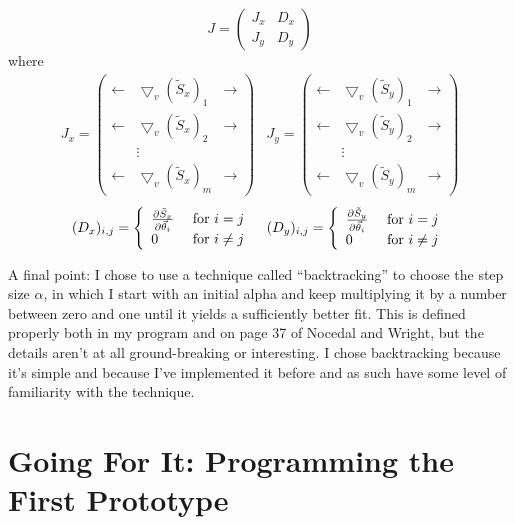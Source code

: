 \documentclass[12pt, letterpaper]{article}
\begin{document}
\[J=\begin{pmatrix}J_x & D_x \\ J_y & D_y\end{pmatrix}\]
where
\[\begin{matrix}J_x=\begin{pmatrix}
\leftarrow & \bigtriangledown_v(\tilde{S}_x)_1 & \rightarrow\\
\leftarrow & \bigtriangledown_v(\tilde{S}_x)_2 & \rightarrow\\
& \vdots &\\
\leftarrow & \bigtriangledown_v(\tilde{S}_x)_m & \rightarrow
\end{pmatrix}
&
J_y=\begin{pmatrix}
\leftarrow & \bigtriangledown_v(\tilde{S}_y)_1 & \rightarrow\\
\leftarrow & \bigtriangledown_v(\tilde{S}_y)_2 & \rightarrow\\
& \vdots &\\
\leftarrow & \bigtriangledown_v(\tilde{S}_y)_m & \rightarrow
\end{pmatrix}
\end{matrix}\]
\[\begin{matrix}
(D_x)_{i,j}=\left\{\begin{array}{l l}
\frac{\partial\tilde{S}_x}{\partial\vec{\theta}_i} & \text{ for } i=j\\
0 & \text{ for } i \ne j
\end{array}\right.
&
(D_y)_{i,j}=\left\{\begin{array}{l l}
\frac{\partial\tilde{S}_y}{\partial\vec{\theta}_i} & \text{ for } i=j\\
0 & \text{ for } i \ne j
\end{array}\right.
\end{matrix}\]

A final point:  I chose to use a technique called ``backtracking'' to choose the step size \(\alpha\), in which I start with an initial alpha and keep multiplying it by a number between zero and one until it yields a sufficiently better fit. This is defined properly both in my program and on page 37 of Nocedal and Wright, but the details aren't at all ground-breaking or interesting.  I chose backtracking because it's simple and because I've implemented it before and as such have some level of familiarity with the technique.

\section*{Going For It: Programming the First Prototype}
\end{document}
